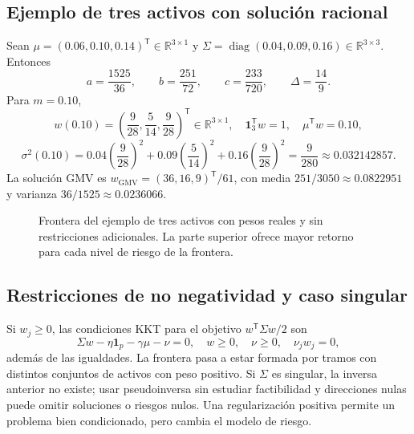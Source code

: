 \documentclass[11pt,a4paper]{article}
\newcommand{\R}{\mathbb R}
\newcommand{\T}{^{\mathsf T}}
\DeclareMathOperator{\diag}{diag}
\newcommand{\ones}{\mathbf 1}
\theoremstyle{definition}
\begin{document}
\subsection{Ejemplo de tres activos con solución racional}
Sean $\mu=(0.06,0.10,0.14)\T\in\R^{3\times1}$ y $\Sigma=\diag(0.04,0.09,0.16)\in\R^{3\times3}$. Entonces
\[
a=\frac{1525}{36},\qquad b=\frac{251}{72},\qquad c=\frac{233}{720},\qquad\Delta=\frac{14}{9}.
\]
Para $m=0.10$,
\[
w(0.10)=\left(\frac9{28},\frac5{14},\frac9{28}\right)\T\in\R^{3\times1},\quad
\ones_3\T w=1,\quad \mu\T w=0.10,
\]
\[
\sigma^2(0.10)=0.04\left(\frac9{28}\right)^2+0.09\left(\frac5{14}\right)^2
+0.16\left(\frac9{28}\right)^2=\frac9{280}\approx0.032142857.
\]
La solución GMV es $w_{\mathrm{GMV}}=(36,16,9)\T/61$, con media $251/3050\approx0.0822951$ y varianza $36/1525\approx0.0236066$.
\begin{figure}[H]\centering
{}
\caption{Frontera del ejemplo de tres activos con pesos reales y sin restricciones adicionales. La parte superior ofrece mayor retorno para cada nivel de riesgo de la frontera.}
\end{figure}
\subsection{Restricciones de no negatividad y caso singular}
Si $w_j\ge0$, las condiciones KKT para el objetivo $w\T\Sigma w/2$ son
\[
\Sigma w-\eta\ones_p-\gamma\mu-\nu=0,\quad
w\ge0,\quad\nu\ge0,\quad\nu_jw_j=0,
\]
además de las igualdades. La frontera pasa a estar formada por tramos con distintos conjuntos de activos con peso positivo. Si $\Sigma$ es singular, la inversa anterior no existe; usar pseudoinversa sin estudiar factibilidad y direcciones nulas puede omitir soluciones o riesgos nulos. Una regularización positiva permite un problema bien condicionado, pero cambia el modelo de riesgo.
\end{document}
